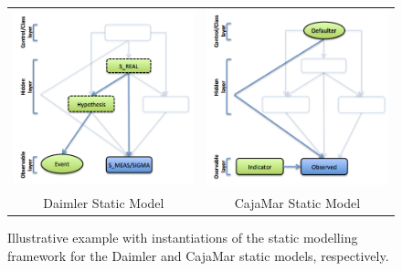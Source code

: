 \begin{figure}[ht!]
\begin{center}
\begin{tabular}{cc}
\includegraphics[scale=0.4]{./figures/DaimlerStaticModelling}
&
\includegraphics[scale=0.4]{./figures/CajaMarStaticModelling}
\\Daimler Static Model & CajaMar Static Model \\
\end{tabular}
\caption{\label{Figure:StaticModellingInstantiations} Illustrative example with instantiations of the static modelling framework for the Daimler and CajaMar static models, respectively.}
\end{center}
\end{figure}
